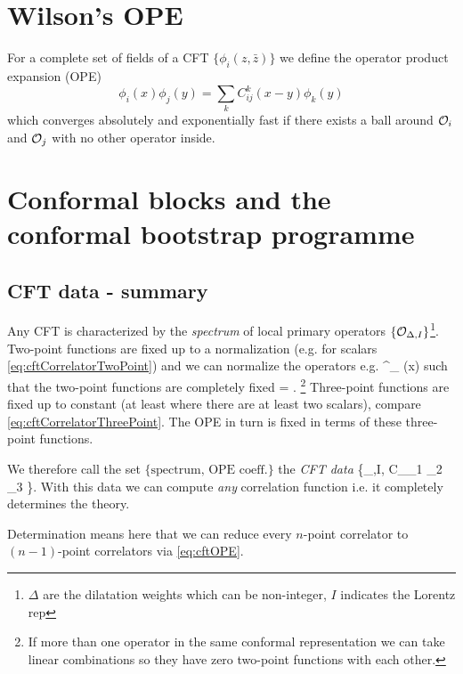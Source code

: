  
 
 
 
 
 
 
 
 
 
 
 
 
 	
 	\section{Wilson's OPE}
 	\begin{mybox}{}
 		For a complete set of fields of a CFT $\{\phi_i(z,\bar{z})\}$ we define the operator product expansion (OPE) 
 		\begin{equation}
 		\phi_i(x) \phi_j(y) = \sum_k C^k_{ij}(x-y) \phi_k(y)
 		\end{equation}
 		which converges absolutely and exponentially fast if there exists a ball around $\mathcal{O}_i$ and $\mathcal{O}_j$ with no other operator inside.
 	\end{mybox}
 	\section{Conformal blocks and the conformal bootstrap programme}
 	\subsection{CFT data - summary}
 	Any CFT is characterized by the \emph{spectrum} of local primary operators $\{\mathcal{O}_{\Delta,I} \}$\footnote{$\Delta$ are the dilatation weights which can be non-integer, $I$ indicates the Lorentz rep}. Two-point functions are fixed up to a normalization (e.g. for scalars \ref{eq:cftCorrelatorTwoPoint}) and we can normalize the operators e.g.
 	\bse 
 	\mO \rightarrow {} \equiv \mO^\prime_{\Delta} (x) 
 	\ese  
 	such that the two-point functions are completely fixed 
 	\bse 
 	 = . 
 	\ese 
 	\footnote{If more than one operator in the same conformal representation we can take linear combinations so they have zero two-point functions with each other.}
 	Three-point functions are fixed up to constant (at least where there are at least two scalars), compare \ref{eq:cftCorrelatorThreePoint}. The OPE in turn is fixed in terms of these three-point functions.
 	\begin{mybox}{}
 		We therefore call the set $\{\text{spectrum, OPE coeff.} \}$ the \emph{CFT data} 
 		\bse 
 		\{\mO_{\Delta,I}, C_{\mO_1 \mO_2 \mO_3} \}.
 		\ese 
 		With this data we can compute \emph{any} correlation function i.e. it completely determines the theory.
 	\end{mybox}
Determination means here that we can reduce every $n$-point correlator to $(n-1)$-point correlators via \ref{eq:cftOPE}.
